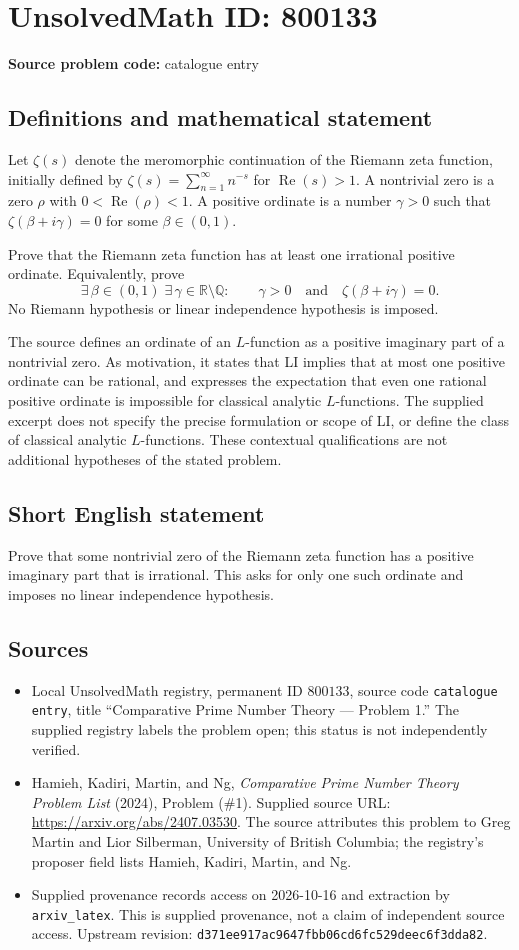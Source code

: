 \documentclass[11pt]{article}
\newcommand{\Q}{\mathbb{Q}}
\newcommand{\R}{\mathbb{R}}
\begin{document}
\section*{UnsolvedMath ID: 800133}
\textbf{Source problem code:} catalogue entry
\subsection{Definitions and mathematical statement}
Let \(\zeta(s)\) denote the meromorphic continuation of the Riemann zeta function, initially defined by \(\zeta(s)=\sum_{n=1}^{\infty}n^{-s}\) for \(\operatorname{Re}(s)>1\). A nontrivial zero is a zero \(\rho\) with \(0<\operatorname{Re}(\rho)<1\). A positive ordinate is a number \(\gamma>0\) such that \(\zeta(\beta+i\gamma)=0\) for some \(\beta\in(0,1)\).

Prove that the Riemann zeta function has at least one irrational positive ordinate. Equivalently, prove
\[
\exists\,\beta\in(0,1)\;\exists\,\gamma\in\R\setminus\Q:\qquad \gamma>0\quad\text{and}\quad\zeta(\beta+i\gamma)=0.
\]
No Riemann hypothesis or linear independence hypothesis is imposed.

The source defines an ordinate of an \(L\)-function as a positive imaginary part of a nontrivial zero. As motivation, it states that LI implies that at most one positive ordinate can be rational, and expresses the expectation that even one rational positive ordinate is impossible for classical analytic \(L\)-functions. The supplied excerpt does not specify the precise formulation or scope of LI, or define the class of classical analytic \(L\)-functions. These contextual qualifications are not additional hypotheses of the stated problem.
\subsection{Short English statement}
Prove that some nontrivial zero of the Riemann zeta function has a positive imaginary part that is irrational. This asks for only one such ordinate and imposes no linear independence hypothesis.
\subsection{Sources}
\begin{itemize}
\item Local UnsolvedMath registry, permanent ID \(800133\), source code \texttt{catalogue entry}, title ``Comparative Prime Number Theory --- Problem 1.'' The supplied registry labels the problem open; this status is not independently verified.
\item Hamieh, Kadiri, Martin, and Ng, \emph{Comparative Prime Number Theory Problem List} (2024), Problem (\#1). Supplied source URL: \url{https://arxiv.org/abs/2407.03530}. The source attributes this problem to Greg Martin and Lior Silberman, University of British Columbia; the registry's proposer field lists Hamieh, Kadiri, Martin, and Ng.
\item Supplied provenance records access on 2026-10-16 and extraction by \texttt{arxiv\_latex}. This is supplied provenance, not a claim of independent source access. Upstream revision: \texttt{d371ee917ac9647fbb06cd6fc529deec6f3dda82}.
\end{itemize}
\end{document}
